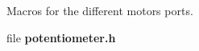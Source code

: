 \begin{DoxyCompactItemize}
\begin{DoxyCompactList}
Macros for the different motors ports. \end{DoxyCompactList}\item 
file \textbf{ potentiometer.\+h}
\end{DoxyCompactItemize}
